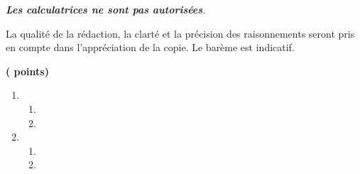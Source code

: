 \documentclass[12pt,french]{book}
\begin{document}
\thispagestyle{garde}

\medskip



\begin{spacing}{1.2} %


\begin{center}
\begin{minipage}{0.8\linewidth}
\begin{center}
\itshape
\textbf{Les calculatrices ne sont pas autorisées}.\par
La qualité de la rédaction, la clarté et la précision des raisonnements seront pris en compte dans l'appréciation de la copie.
Le barème est indicatif.
\end{center}
\end{minipage}
\end{center}

\noindent


\medskip\exercice \hfill \textbf{( points)} \par
\begin{enumerate}[label=\arabic*.]
\item 
	\begin{enumerate}[label=\alph*)]
		
	\item 

		
	\item
	
	\end{enumerate}

\item 
\begin{enumerate}[label=\alph*)]
	\item 
	
	\item 
	
		
	\end{enumerate}

\end{enumerate}






\end{spacing}
\end{document}
